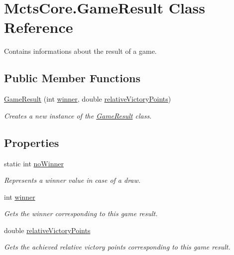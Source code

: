 \hypertarget{class_mcts_core_1_1_game_result}{}\section{Mcts\+Core.\+Game\+Result Class Reference}
\label{class_mcts_core_1_1_game_result}


Contains informations about the result of a game.  


\subsection*{Public Member Functions}
\begin{DoxyCompactItemize}
\item 
\mbox{\hyperlink{class_mcts_core_1_1_game_result_a8c9838394b760c3e23498f1033be9727}{Game\+Result}} (int \mbox{\hyperlink{class_mcts_core_1_1_game_result_a77b59124aac0ba1f2cb5e0e131510cea}{winner}}, double \mbox{\hyperlink{class_mcts_core_1_1_game_result_a9620ecf5f08cc09f1d2ea5bf5568c3cc}{relative\+Victory\+Points}})
\begin{DoxyCompactList}\small\item\em Creates a new instance of the \mbox{\hyperlink{class_mcts_core_1_1_game_result}{Game\+Result}} class. \end{DoxyCompactList}\end{DoxyCompactItemize}
\subsection*{Properties}
\begin{DoxyCompactItemize}
\item 
static int \mbox{\hyperlink{class_mcts_core_1_1_game_result_acd7dea3def32dcf23531395d28688a4e}{no\+Winner}}
\begin{DoxyCompactList}\small\item\em Represents a winner value in case of a draw. \end{DoxyCompactList}\item 
int \mbox{\hyperlink{class_mcts_core_1_1_game_result_a77b59124aac0ba1f2cb5e0e131510cea}{winner}}
\begin{DoxyCompactList}\small\item\em Gets the winner corresponding to this game result. \end{DoxyCompactList}\item 
double \mbox{\hyperlink{class_mcts_core_1_1_game_result_a9620ecf5f08cc09f1d2ea5bf5568c3cc}{relative\+Victory\+Points}}
\begin{DoxyCompactList}\small\item\em Gets the achieved relative victory points corresponding to this game result. \end{DoxyCompactList}\end{DoxyCompactItemize}


